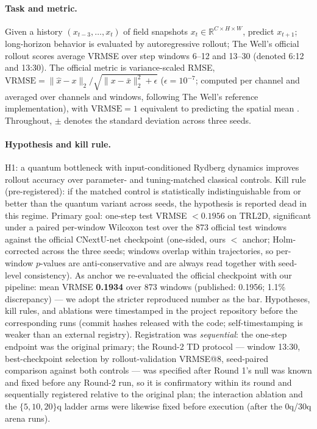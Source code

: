 \documentclass{article}
\newcommand{\TRLanchorRepro}{0.1934}  %
\newcommand{\TRLanchorPub}{0.1956}    %
\newcommand{\TRLwindows}{873}         %
\begin{document}
\paragraph{Task and metric.} Given a history $(x_{t-3},\dots,x_t)$ of field
snapshots $x_t \in \mathbb{R}^{C \times H \times W}$, predict $x_{t+1}$;
long-horizon behavior is evaluated by autoregressive rollout; The Well's
official rollout scores average VRMSE over step windows 6--12 and 13--30
(denoted 6:12 and 13:30). The official
metric is variance-scaled RMSE,
$\mathrm{VRMSE} = \|\hat x - x\|_2 / \sqrt{\|x - \bar x\|_2^2 + \epsilon}$ ($\epsilon = 10^{-7}$; computed per
channel and averaged over channels and windows, following The Well's
reference implementation), with $\mathrm{VRMSE}=1$ equivalent to
predicting the spatial mean \citep{ohana2024thewell}. Throughout,
$\pm$ denotes the standard deviation across three seeds.

\paragraph{Hypothesis and kill rule.} H1: a quantum bottleneck with
input-conditioned Rydberg dynamics improves rollout accuracy over parameter-
and tuning-matched classical controls. Kill rule (pre-registered): if the
matched control is statistically indistinguishable from or better than the
quantum variant across seeds, the hypothesis is reported dead in this
regime.
Primary goal: one-step test VRMSE $< \TRLanchorPub$ on TRL2D, significant
under a paired per-window Wilcoxon test over the \TRLwindows{} official
test windows against the official CNextU-net checkpoint (one-sided,
ours $<$ anchor; Holm-corrected across the three seeds; windows overlap
within trajectories, so per-window $p$-values are anti-conservative and are
always read together with seed-level consistency). As anchor we
re-evaluated the official checkpoint with our pipeline: mean VRMSE
\textbf{\TRLanchorRepro} over \TRLwindows{} windows (published:
\TRLanchorPub; 1.1\% discrepancy) --- we adopt the stricter reproduced
number as the bar. Hypotheses, kill rules, and ablations were timestamped
in the project repository before the corresponding runs (commit hashes
released with the code; self-timestamping is weaker than an external
registry). Registration was \emph{sequential}: the one-step endpoint was
the original primary; the Round-2 TD protocol --- window 13:30,
best-checkpoint selection by rollout-validation VRMSE@8, seed-paired
comparison against both controls --- was specified after Round 1's null
was known and fixed before any Round-2 run, so it is confirmatory within
its round and sequentially registered relative to the original plan; the
interaction ablation and the $\{5,10,20\}$q ladder arms were likewise
fixed before execution (after the 0q/30q arena runs).
\end{document}
